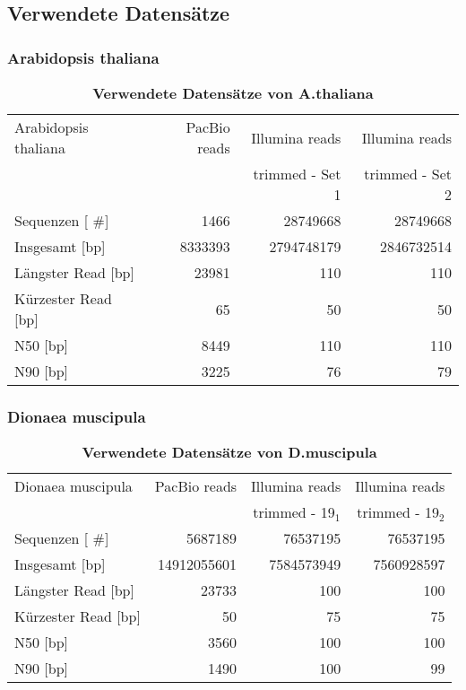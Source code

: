 \documentclass{scrartcl}
\begin{document}
\clearpage
\subsection{Verwendete Datensätze}
\label{sec-4-4}
\subsubsection{Arabidopsis thaliana}
\label{sec-4-4-1}
\begin{table}[!ht]
\caption[Verwendete Datensätze von A.thaliana]{\textbf{Verwendete Datensätze von A.thaliana} }
\begin{center}
\begin{tabular}{lrrr}
Arabidopsis thaliana & PacBio reads & Illumina reads & Illumina reads\\
 &  & trimmed - Set 1 & trimmed - Set 2\\
\hline
Sequenzen        [ \#] & 1466 & 28749668 & 28749668\\
Insgesamt        [bp] & 8333393 & 2794748179 & 2846732514\\
Längster Read    [bp] & 23981 & 110 & 110\\
Kürzester Read   [bp] & 65 & 50 & 50\\
N50              [bp] & 8449 & 110 & 110\\
N90              [bp] & 3225 & 76 & 79\\
\end{tabular}
\end{center}
\end{table}

\subsubsection{Dionaea muscipula}
\label{sec-4-4-2}
\begin{table}[!ht]
\caption[Verwendete Datensätze von D.muscipula]{\textbf{Verwendete Datensätze von D.muscipula}}
\begin{center}
\begin{tabular}{lrrr}
Dionaea muscipula & PacBio reads & Illumina reads & Illumina reads\\
 &  & trimmed - 19$_{\text{1}}$ & trimmed -  19$_{\text{2}}$\\
\hline
Sequenzen        [ \#] & 5687189 & 76537195 & 76537195\\
Insgesamt        [bp] & 14912055601 & 7584573949 & 7560928597\\
Längster Read    [bp] & 23733 & 100 & 100\\
Kürzester Read   [bp] & 50 & 75 & 75\\
N50              [bp] & 3560 & 100 & 100\\
N90              [bp] & 1490 & 100 & 99\\
\end{tabular}
\end{center}
\end{table}
\end{document}
